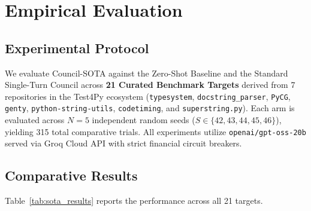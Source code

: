 \documentclass[conference]{IEEEtran}
\begin{document}
\section{Empirical Evaluation}
\subsection{Experimental Protocol}
We evaluate Council-SOTA against the Zero-Shot Baseline and the Standard Single-Turn Council across \textbf{21 Curated Benchmark Targets} derived from 7 repositories in the Test4Py ecosystem (\texttt{typesystem}, \texttt{docstring\_parser}, \texttt{PyCG}, \texttt{genty}, \texttt{python-string-utils}, \texttt{codetiming}, and \texttt{superstring.py}). Each arm is evaluated across $N=5$ independent random seeds ($S \in \{42, 43, 44, 45, 46\}$), yielding 315 total comparative trials. All experiments utilize \texttt{openai/gpt-oss-20b} served via Groq Cloud API with strict financial circuit breakers.

\subsection{Comparative Results}
Table~\ref{tab:sota_results} reports the performance across all 21 targets.
\end{document}
